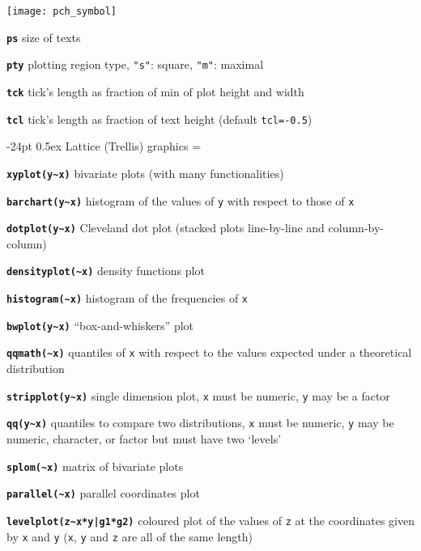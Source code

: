 \documentclass[8pt,landscape]{article}
\makeatletter
\renewcommand\section{\@startsection{section}{1}{0mm}%
                                     {-24pt}%
                                     {0.5ex}%
                                {\color{blue}\normalfont\large\bfseries}}
\newcommand{\code}{\texttt}
\newcommand{\bcode}[1]{\texttt{\textbf{#1}}}
\makeatother
\begin{document}
\begin{multicols*}{3}
\samepage\texttt{[image: pch\_symbol]} 

\bcode{ps}   size of texts

\bcode{pty}  plotting region type, \code{"s"}: square, \code{"m"}: maximal

\bcode{tck}  tick's length as fraction of min of plot height and width

\bcode{tcl}  tick's length as  fraction of text height (default \code{tcl=-0.5})




\section{Lattice (Trellis) graphics}
\everypar={\hangindent=9mm}

\bcode{xyplot(y\~{}x)}  bivariate plots (with many functionalities)

\bcode{barchart(y\~{}x)}  histogram of the values of \code{y} with
respect to those of \code{x}

\bcode{dotplot(y\~{}x)}  Cleveland dot plot (stacked plots line-by-line
and column-by-column)

\bcode{densityplot(\~{}x)}  density functions plot

\bcode{histogram(\~{}x)}  histogram of the frequencies of \code{x}

\bcode{bwplot(y\~{}x)}  ``box-and-whiskers'' plot

\bcode{qqmath(\~{}x)}  quantiles of \code{x} with respect to the values expected under a theoretical distribution

\bcode{stripplot(y\~{}x)}  single dimension plot, \code{x} must be numeric, \code{y} may be a factor

\bcode{qq(y\~{}x)}  quantiles to compare two distributions, \code{x} must be numeric, \code{y} may be numeric, character, or factor but must have two `levels'

\bcode{splom(\~{}x)}  matrix of bivariate plots

\bcode{parallel(\~{}x)}  parallel coordinates plot

\bcode{levelplot(z\~{}x*y|g1*g2)}  coloured plot of the values of \code{z} at the coordinates given by \code{x} and \code{y} (\code{x}, \code{y} and \code{z} are all of the same length)


\end{multicols*}
\end{document}
